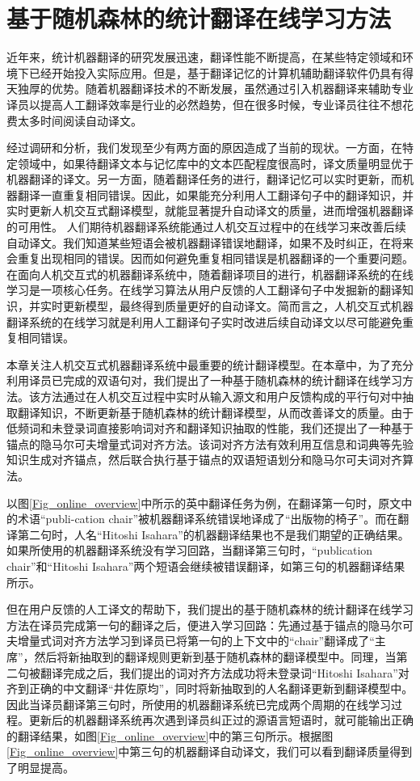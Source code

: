
\chapter{基于随机森林的统计翻译在线学习方法}
\label{Chapter_online}

近年来，统计机器翻译的研究发展迅速，翻译性能不断提高，在某些特定领域和环境下已经开始投入实际应用。但是，基于翻译记忆的计算机辅助翻译软件仍具有得天独厚的优势。随着机器翻译技术的不断发展，虽然通过引入机器翻译来辅助专业译员以提高人工翻译效率是行业的必然趋势，但在很多时候，专业译员往往不想花费太多时间阅读自动译文。

经过调研和分析，我们发现至少有两方面的原因造成了当前的现状。一方面，在特定领域中，如果待翻译文本与记忆库中的文本匹配程度很高时，译文质量明显优于机器翻译的译文。另一方面，随着翻译任务的进行，翻译记忆可以实时更新，而机器翻译一直重复相同错误。因此，如果能充分利用人工翻译句子中的翻译知识，并实时更新人机交互式翻译模型，就能显著提升自动译文的质量，进而增强机器翻译的可用性。
人们期待机器翻译系统能通过人机交互过程中的在线学习来改善后续自动译文。我们知道某些短语会被机器翻译错误地翻译，如果不及时纠正，在将来会重复出现相同的错误。因而如何避免重复相同错误是机器翻译的一个重要问题。在面向人机交互式的机器翻译系统中，随着翻译项目的进行，机器翻译系统的在线学习是一项核心任务。在线学习算法从用户反馈的人工翻译句子中发掘新的翻译知识，并实时更新模型，最终得到质量更好的自动译文。简而言之，人机交互式机器翻译系统的在线学习就是利用人工翻译句子实时改进后续自动译文以尽可能避免重复相同错误。

本章关注人机交互式机器翻译系统中最重要的统计翻译模型。在本章中，为了充分利用译员已完成的双语句对，我们提出了一种基于随机森林的统计翻译在线学习方法。该方法通过在人机交互过程中实时从输入源文和用户反馈构成的平行句对中抽取翻译知识，不断更新基于随机森林的统计翻译模型，从而改善译文的质量。由于低频词和未登录词直接影响词对齐和翻译知识抽取的性能，我们还提出了一种基于锚点的隐马尔可夫增量式词对齐方法。该词对齐方法有效利用互信息和词典等先验知识生成对齐锚点，然后联合执行基于锚点的双语短语划分和隐马尔可夫词对齐算法。

以图\ref{Fig_online_overview}中所示的英中翻译任务为例，在翻译第一句时，原文中的术语“publi-cation chair”被机器翻译系统错误地译成了“出版物的椅子”。而在翻译第二句时，人名“Hitoshi Isahara”的机器翻译结果也不是我们期望的正确结果。如果所使用的机器翻译系统没有学习回路，当翻译第三句时，“publication chair”和“Hitoshi Isahara”两个短语会继续被错误翻译，如第三句的机器翻译结果所示。

但在用户反馈的人工译文的帮助下，我们提出的基于随机森林的统计翻译在线学习方法在译员完成第一句的翻译之后，便进入学习回路：先通过基于锚点的隐马尔可夫增量式词对齐方法学习到译员已将第一句的上下文中的“chair”翻译成了“主席”，然后将新抽取到的翻译规则更新到基于随机森林的翻译模型中。同理，当第二句被翻译完成之后，我们提出的词对齐方法成功将未登录词“Hitoshi Isahara”对齐到正确的中文翻译“井佐原均”，同时将新抽取到的人名翻译更新到翻译模型中。因此当译员翻译第三句时，所使用的机器翻译系统已完成两个周期的在线学习过程。更新后的机器翻译系统再次遇到译员纠正过的源语言短语时，就可能输出正确的翻译结果，如图\ref{Fig_online_overview}中的第三句所示。根据图\ref{Fig_online_overview}中第三句的机器翻译自动译文，我们可以看到翻译质量得到了明显提高。

